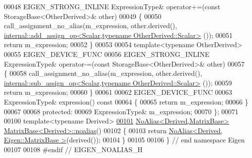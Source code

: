 \begin{DoxyCode}
00048     EIGEN\_STRONG\_INLINE ExpressionType& operator+=(\textcolor{keyword}{const} StorageBase<OtherDerived>& other)
00049     \{
00050       call\_assignment\_no\_alias(m\_expression, other.derived(), 
      \hyperlink{struct_eigen_1_1internal_1_1add__assign__op}{internal::add\_assign\_op<Scalar,typename OtherDerived::Scalar>}
      ());
00051       \textcolor{keywordflow}{return} m\_expression;
00052     \}
00053     
00054     \textcolor{keyword}{template}<\textcolor{keyword}{typename} OtherDerived>
00055     EIGEN\_DEVICE\_FUNC
00056     EIGEN\_STRONG\_INLINE ExpressionType& operator-=(\textcolor{keyword}{const} StorageBase<OtherDerived>& other)
00057     \{
00058       call\_assignment\_no\_alias(m\_expression, other.derived(), 
      \hyperlink{struct_eigen_1_1internal_1_1sub__assign__op}{internal::sub\_assign\_op<Scalar,typename OtherDerived::Scalar>}
      ());
00059       \textcolor{keywordflow}{return} m\_expression;
00060     \}
00061 
00062     EIGEN\_DEVICE\_FUNC
00063     ExpressionType& expression()\textcolor{keyword}{ const}
00064 \textcolor{keyword}{    }\{
00065       \textcolor{keywordflow}{return} m\_expression;
00066     \}
00067 
00068   \textcolor{keyword}{protected}:
00069     ExpressionType& m\_expression;
00070 \};
00071 
00100 \textcolor{keyword}{template}<\textcolor{keyword}{typename} Derived>
\hyperlink{group___core___module_a2c1085de7645f23f240876388457da0b}{00101} \hyperlink{group___core___module_class_eigen_1_1_no_alias}{NoAlias<Derived,MatrixBase>} 
      \hyperlink{group___core___module_a2c1085de7645f23f240876388457da0b}{MatrixBase<Derived>::noalias}()
00102 \{
00103   \textcolor{keywordflow}{return} \hyperlink{group___core___module_class_eigen_1_1_no_alias}{NoAlias<Derived, Eigen::MatrixBase >}(derived());
00104 \}
00105 
00106 \} \textcolor{comment}{// end namespace Eigen}
00107 
00108 \textcolor{preprocessor}{#endif // EIGEN\_NOALIAS\_H}
\end{DoxyCode}
